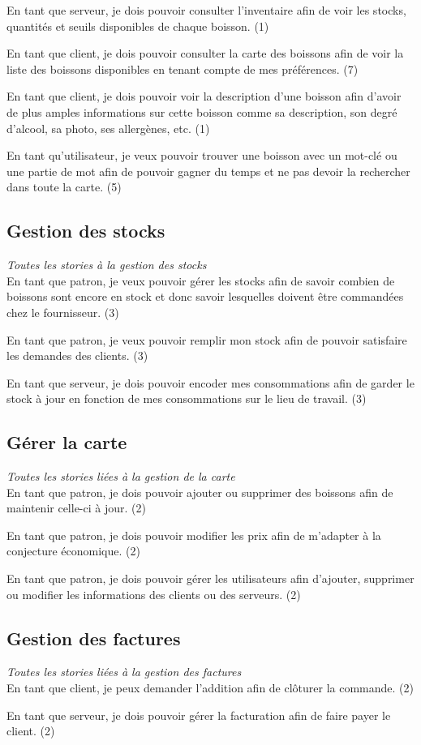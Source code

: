 \documentclass[10pt, a4, oneside, headings=normal]{scrartcl}
\begin{document}
En tant que serveur, je dois pouvoir consulter l'inventaire afin de voir les stocks, quantités et seuils disponibles de chaque boisson. (1)

En tant que client, je dois pouvoir consulter la carte des boissons afin de voir la liste des boissons disponibles en tenant compte de mes préférences. (7)

En tant que client, je dois pouvoir voir la description d'une boisson afin d'avoir de plus amples informations sur cette boisson comme sa description, son degré d'alcool, sa photo, ses allergènes, etc. (1)

En tant qu'utilisateur, je veux pouvoir trouver une boisson avec un mot-clé ou une partie de mot afin de pouvoir gagner du temps et ne pas devoir la rechercher dans toute la carte. (5)

\subsection{Gestion des stocks}
\emph{Toutes les stories à la gestion des stocks}
\\

En tant que patron, je veux pouvoir gérer les stocks afin de savoir combien de boissons sont encore en stock et donc savoir lesquelles doivent être commandées chez le fournisseur. (3)

En tant que patron, je veux pouvoir remplir mon stock afin de pouvoir satisfaire les demandes des clients. (3)

En tant que serveur, je dois pouvoir encoder mes consommations afin de garder le stock à jour en fonction de mes consommations sur le lieu de travail. (3)

\subsection{Gérer la carte}
\emph{Toutes les stories liées à la gestion de la carte}
\\

En tant que patron, je dois pouvoir ajouter ou supprimer des boissons afin de maintenir celle-ci à jour. (2)

En tant que patron, je dois pouvoir modifier les prix afin de m'adapter à la conjecture économique. (2)

En tant que patron, je dois pouvoir gérer les utilisateurs afin d'ajouter, supprimer ou modifier les informations des clients ou des serveurs. (2)

\subsection{Gestion des factures}
\emph{Toutes les stories liées à la gestion des factures}
\\

En tant que client, je peux demander l'addition afin de clôturer la commande. (2)

En tant que serveur, je dois pouvoir gérer la facturation afin de faire payer le client. (2)
\end{document}
